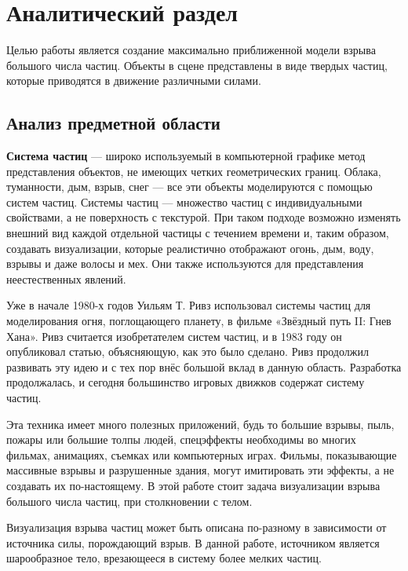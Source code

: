 \chapter{\textbf{Аналитический раздел}}
\hfill

Целью работы является создание максимально приближенной модели взрыва большого числа частиц. Объекты в сцене представлены в виде твердых частиц, которые приводятся в движение различными силами.  

\section{\textbf{Анализ предметной области }}

\textbf{Система частиц} --- широко используемый в компьютерной графике метод представления объектов, не имеющих четких геометрических границ. Облака, туманности, дым, взрыв, снег --- все эти объекты моделируются с помощью систем частиц. Системы частиц --- множество частиц с индивидуальными свойствами, а не поверхность с текстурой. При таком подходе возможно изменять внешний вид каждой отдельной частицы с течением времени и, таким образом, создавать визуализации, которые реалистично отображают огонь, дым, воду, взрывы и даже волосы и мех. Они также используются для представления неестественных явлений.  \cite{definition}

Уже в начале 1980-х годов Уильям Т. Ривз использовал системы частиц для моделирования огня, поглощающего планету, в фильме «Звёздный путь II: Гнев Хана». Ривз считается изобретателем систем частиц, и в 1983 году он опубликовал статью, объясняющую, как это было сделано. Ривз продолжил развивать эту идею и с тех пор внёс большой вклад в данную область. Разработка продолжалась, и сегодня большинство игровых движков содержат систему частиц. \cite{particlesystems}

Эта техника имеет много полезных приложений, будь то большие взрывы, пыль, пожары или большие толпы людей, спецэффекты необходимы во многих фильмах, анимациях, съемках или компьютерных играх. Фильмы, показывающие массивные взрывы и разрушенные здания, могут имитировать эти эффекты, а не создавать их по-настоящему. В этой работе стоит задача визуализации взрыва большого числа частиц, при столкновении с телом.
	
Визуализация взрыва частиц может быть описана по-разному в зависимости от источника силы, порождающий взрыв. В данной работе, источником является шарообразное тело, врезающееся в систему более мелких частиц.
	
